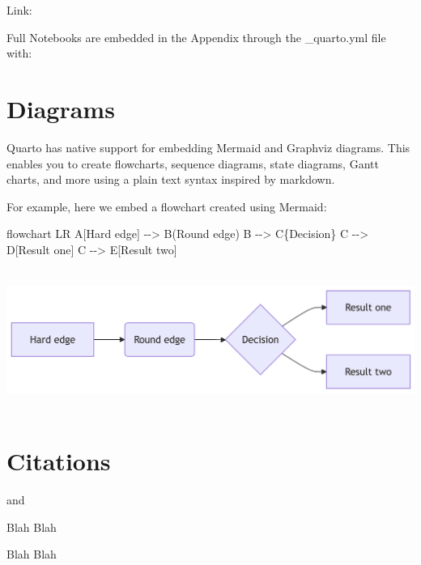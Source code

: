 \documentclass[
  11pt,
  letterpaper,
]{book}
\newenvironment{Shaded}{\begin{snugshade}}{\end{snugshade}}
\newcommand{\NormalTok}[1]{\textcolor[rgb]{0.00,0.23,0.31}{#1}}
\begin{document}
Link:

Full Notebooks are embedded in the Appendix through the \_quarto.yml
file with:

\section*{Diagrams}\label{diagrams}


Quarto has native support for embedding Mermaid and Graphviz diagrams.
This enables you to create flowcharts, sequence diagrams, state
diagrams, Gantt charts, and more using a plain text syntax inspired by
markdown.

For example, here we embed a flowchart created using Mermaid:

\begin{Shaded}
\begin{Highlighting}[]
\NormalTok{flowchart LR}
\NormalTok{  A[Hard edge] {-}{-}\textgreater{} B(Round edge)}
\NormalTok{  B {-}{-}\textgreater{} C\{Decision\}}
\NormalTok{  C {-}{-}\textgreater{} D[Result one]}
\NormalTok{  C {-}{-}\textgreater{} E[Result two]}
\end{Highlighting}
\end{Shaded}

\includegraphics[width=6.88in,height=1.81in]{index_files/figure-latex/mermaid-figure-1.png}

\section*{Citations}\label{sec-citations}


\textcite{soares2014}

\autocite{soares2014} and \autocite{knuth1984}

Blah Blah \autocites[see][33-35]{knuth1984}[also][chap.~1]{growiec2024}

Blah Blah \autocite[33-35, 38-39 and passim]{knuth1984}
\end{document}
